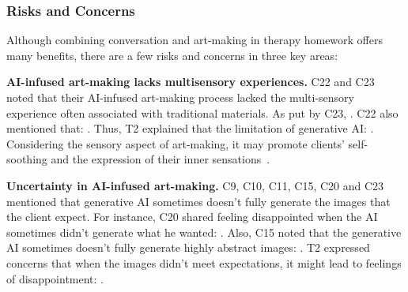 \subsubsection{\textbf{Risks and Concerns}}
Although combining conversation and art-making in therapy homework offers many benefits, there are a few risks and concerns in three key areas:

\textbf{AI-infused art-making lacks multisensory experiences.} 
C22 and C23 noted that their AI-infused art-making process lacked the multi-sensory experience often associated with traditional materials.
As put by C23, . 
C22 also mentioned that: .
Thus, T2 explained that the limitation of generative AI: . 
Considering the sensory aspect of art-making, it may promote clients' self-soothing and the expression of their inner sensations~\cite{lusebrink1990imagery}.

\textbf{Uncertainty in AI-infused art-making.} 
C9, C10, C11, C15, C20 and C23 mentioned that generative AI sometimes doesn't fully generate the images that the client expect. 
For instance, C20 shared feeling disappointed when the AI sometimes didn't generate what he wanted: . 
Also, C15 noted that the generative AI sometimes doesn't fully generate highly abstract images: .
T2 expressed concerns that when the images didn't meet expectations, it might lead to feelings of disappointment: .

